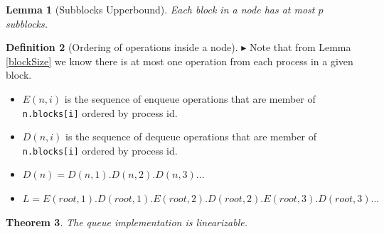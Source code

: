 \documentclass[10pt]{article}
\renewcommand{\tt}[1]{\texttt{#1}}
\newtheorem{theorem}{Theorem}
\newtheorem{lemma}[theorem]{Lemma}
\theoremstyle{definition}
\newtheorem{definition}[theorem]{Definition}
\begin{document}
\begin{lemma}[Subblocks Upperbound]\label{subBlocksBound}
Each block in a node  has at most $p$ subblocks.
\end{lemma}

\begin{definition} [Ordering of operations inside a node] \label{ordering}
$\blacktriangleright$ Note that from Lemma \ref{blockSize} we know there is at most one operation from each process in a given block.

\begin{itemize}
  \item $E(n,i)$ is the sequence of enqueue operations that are member of \tt{n.blocks[i]} ordered by process id.
  \item 
$D(n,i)$ is the sequence of dequeue operations that are member of \tt{n.blocks[i]} ordered by process id.
\item $D(n)=D(n,1).D(n,2).D(n,3)...$
\item $L=E(root,1).D(root,1).E(root,2).D(root,2).E(root,3).D(root,3)...$
\end{itemize}
\end{definition}

\begin{theorem}
The queue implementation is linearizable.
\end{theorem}
\end{document}
